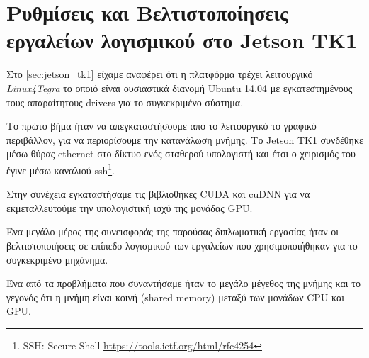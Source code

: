 \section{Ρυθμίσεις και Βελτιστοποίησεις εργαλείων λογισμικού στο Jetson TK1}

Στο \autoref{sec:jetson_tk1} είχαμε αναφέρει ότι η πλατφόρμα τρέχει
λειτουργικό \emph{Linux4Tegra} το οποιό είναι ουσιαστικά διανομή Ubuntu 14.04
με εγκατεστημένους τους απαραίτητους drivers για το συγκεκριμένο σύστημα.

Το πρώτο βήμα ήταν να απεγκαταστήσουμε από το λειτουργικό το
γραφικό περιβάλλον, για να περιορίσουμε την κατανάλωση μνήμης. Το Jetson TK1 συνδέθηκε
μέσω θύρας ethernet στο δίκτυο ενός σταθερού υπολογιστή και έτσι ο χειρισμός
του έγινε μέσω καναλιού ssh\footnote{SSH: Secure Shell \href{https://tools.ietf.org/html/rfc4254}{https://tools.ietf.org/html/rfc4254}}.

Στην συνέχεια εγκαταστήσαμε τις βιβλιοθήκες CUDA και cuDNN για να εκμεταλλευτούμε
την υπολογιστική ισχύ της μονάδας GPU.

Ένα μεγάλο μέρος της συνεισφοράς της παρούσας διπλωματική εργασίας
ήταν οι βελτιστοποιήσεις σε επίπεδο λογισμικού των εργαλείων που χρησιμοποιήθηκαν
για το συγκεκριμένο μηχάνημα.

Ένα από τα προβλήματα που συναντήσαμε ήταν το μεγάλο μέγεθος της μνήμης και το γεγονός
ότι η μνήμη είναι κοινή (shared memory) μεταξύ των μονάδων CPU και GPU.



\label{sec:implementations_jetson}

